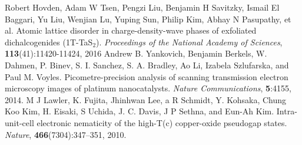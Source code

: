 \documentclass[12pt]{article}
\begin{document}
\begin{thebibliography}{99}
    Robert Hovden, Adam W Tsen, Pengzi Liu, Benjamin H Savitzky, Ismail El Baggari, Yu Liu, Wenjian Lu, Yuping Sun, Philip Kim, Abhay N Pasupathy, et al. Atomic lattice disorder in charge-density-wave phases of exfoliated dichalcogenides (1T-TaS$_2$). \textit{Proceedings of the National Academy of Sciences}, \textbf{113}(41):11420-11424, 2016
    Andrew B. Yankovich, Benjamin Berkels, W. Dahmen, P. Binev, S. I. Sanchez, S. A. Bradley, Ao Li, Izabela Szlufarska, and Paul M. Voyles. Picometre-precision analysis of scanning transmission electron microscopy images of platinum nanocatalysts. \textit{Nature Communications}, \textbf{5}:4155, 2014.
    M J Lawler, K. Fujita, Jhinhwan Lee, a R Schmidt, Y. Kohsaka, Chung Koo Kim, H. Eisaki, S Uchida, J. C. Davis, J P Sethna, and Eun-Ah Kim. Intra-unit-cell electronic nematicity of the high-T(c) copper-oxide pseudogap states. \textit{Nature}, \textbf{466}(7304):347–351, 2010.
\end{thebibliography}
\end{document}
